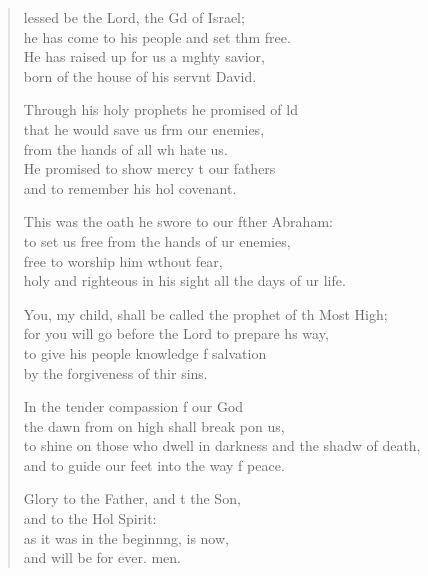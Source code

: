 \settowidth{\versewidth}{to shine on those who dwell in darkness and the shadow of death, *}
\begin{verse}%
  \begin{patverse}
lessed be the Lord, the Gd of Israel;\Med\\
he has come to his people and set thm free.\\
He has raised up for us a m\pointup{\i}ghty savior,\Med\\
born of the house of his servnt David.

Through his holy prophets he promised of ld\Flex\\
that he would save us frm our enemies,\Med\\
from the hands of all wh hate us.\\
He promised to show mercy t our fathers\Med\\
and to remember his hol covenant.

This was the oath he swore to our fther Abraham:\Med\\
to set us free from the hands of ur enemies,\\
free to worship him w\pointup{\i}thout fear,\Med\\
holy and righteous in his sight all the days of ur life.

You, my child, shall be called the prophet of th Most High;\Med\\
for you will go before the Lord to prepare h\pointup{\i}s way,\\
to give his people knowledge f salvation\Med\\
by the forgiveness of thir sins.

In the tender compassion f our God\Med\\
the dawn from on high shall break pon us,\\
to shine on those who dwell in darkness and the shadw of death,\Med\\
and to guide our feet into the way f peace.

Glory to the Father, and t the Son,\Med\\
and to the Hol Spirit:\\
as it was in the beginn\pointup{\i}ng, is now,\Med\\
and will be for ever. men.
  \end{patverse}
  \end{verse}
